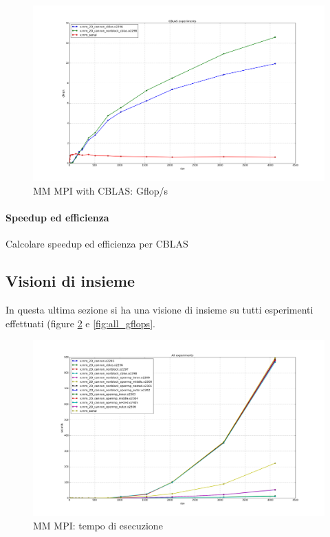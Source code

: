 \begin{figure}[htbp]
    \begin{center}
        \includegraphics[width=15cm]{immagini/cblas_gflops.png}
    \end{center}
    \caption{MM MPI with CBLAS: Gflop/s}
    \label{fig:cblas_gflops}
\end{figure}

\paragraph{Speedup ed efficienza}
Calcolare speedup ed efficienza per CBLAS

\subsection{Visioni di insieme}
In questa ultima sezione si ha una visione di insieme su tutti esperimenti effettuati (figure \ref{fig:all_times} e \ref{fig:all_gflops}.

\begin{figure}[htbp]
    \begin{center}
        \includegraphics[width=15cm]{immagini/all_times.png}
    \end{center}
    \caption{MM MPI: tempo di esecuzione}
    \label{fig:all_times}
\end{figure}

